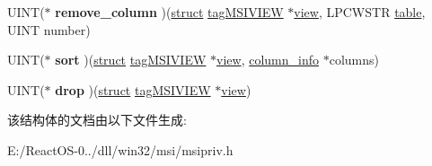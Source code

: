 \begin{DoxyCompactItemize}
U\+I\+NT($\ast$ {\bfseries remove\+\_\+column} )(\hyperlink{interfacestruct}{struct} \hyperlink{structtag_m_s_i_v_i_e_w}{tag\+M\+S\+I\+V\+I\+EW} $\ast$\hyperlink{structview}{view}, L\+P\+C\+W\+S\+TR \hyperlink{structtable}{table}, U\+I\+NT number)
\item 
\mbox{\label{structtag_m_s_i_v_i_e_w_o_p_s_a3c53f0f13c6027c1ddcbce52d486e82e}} 
U\+I\+NT($\ast$ {\bfseries sort} )(\hyperlink{interfacestruct}{struct} \hyperlink{structtag_m_s_i_v_i_e_w}{tag\+M\+S\+I\+V\+I\+EW} $\ast$\hyperlink{structview}{view}, \hyperlink{struct__column__info}{column\+\_\+info} $\ast$columns)
\item 
\mbox{\label{structtag_m_s_i_v_i_e_w_o_p_s_af14078732d06cff6d01ae671adbdaa10}} 
U\+I\+NT($\ast$ {\bfseries drop} )(\hyperlink{interfacestruct}{struct} \hyperlink{structtag_m_s_i_v_i_e_w}{tag\+M\+S\+I\+V\+I\+EW} $\ast$\hyperlink{structview}{view})
\end{DoxyCompactItemize}


该结构体的文档由以下文件生成\+:\begin{DoxyCompactItemize}
\item 
E\+:/\+React\+O\+S-\/0../dll/win32/msi/msipriv.\+h\end{DoxyCompactItemize}
